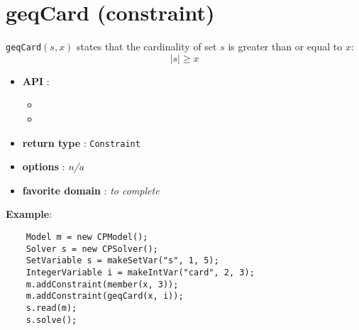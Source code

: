 \label{geqcard}
\hypertarget{geqcard}{}

\section{geqCard (constraint)}\label{geqcard:geqcardconstraint}\hypertarget{geqcard:geqcardconstraint}{}
\begin{notedef}
  \texttt{geqCard}$(s,x)$ states that the cardinality of set $s$ is greater than or equal to $x$:
$$|s| \ge x$$
\end{notedef}

\begin{itemize}
	\item \textbf{API} :
	\begin{itemize}
		\item {}
		\item {}
	\end{itemize}
	\item \textbf{return type} : \texttt{Constraint}
	\item \textbf{options} : \emph{n/a}
	\item \textbf{favorite domain} : \emph{to complete}
\end{itemize}

\textbf{Example}:
\begin{lstlisting}
	Model m = new CPModel();
	Solver s = new CPSolver();
	SetVariable s = makeSetVar("s", 1, 5);
	IntegerVariable i = makeIntVar("card", 2, 3);
	m.addConstraint(member(x, 3));
	m.addConstraint(geqCard(x, i));
	s.read(m);
	s.solve();
\end{lstlisting}
